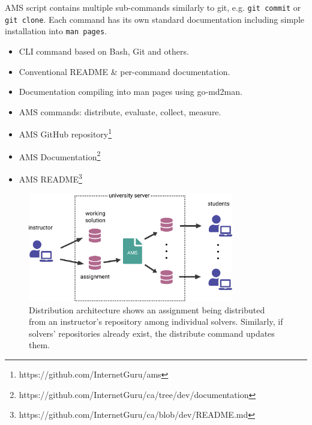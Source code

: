 {AMS script contains multiple sub-commands similarly to git, e.g. \texttt{git commit} or \texttt{git clone}. Each command has its own standard documentation including simple installation into \texttt{man pages}.}

\begin{itemize}
\item
  {CLI command based on Bash, Git and others.}
\item
  {Conventional README \& per-command documentation.}
\item
  {Documentation compiling into man pages using go-md2man.}
\item
  {AMS commands: distribute, evaluate, collect, measure.}
\item
  {AMS GitHub repository\footnote{https://github.com/InternetGuru/ams}}
\item
  {AMS Documentation\footnote{https://github.com/InternetGuru/ca/tree/dev/documentation}}
\item
  {AMS README\footnote{https://github.com/InternetGuru/ca/blob/dev/README.md}}
\end{itemize}

\begin{figure}[H]
    \centering
    \includegraphics[width=0.8\textwidth,height=\textheight,keepaspectratio]{Figures/impl/image5.png}
    \caption[Distribution architecture diagram]{Distribution architecture shows an assignment being distributed from an instructor's repository among individual solvers. Similarly, if solvers' repositories already exist, the distribute command updates them.}
\end{figure}

